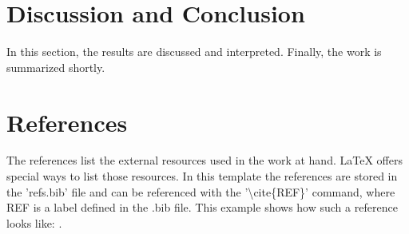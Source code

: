 \documentclass[twocolumn]{article}
\begin{document}
\section{Discussion and Conclusion}
In this section, the results are discussed and interpreted. Finally, the work is summarized shortly.

\section{References}
The references list the external resources used in the work at hand. \LaTeX$ $  offers special ways to list those resources. In this template the references are stored in the 'refs.bib' file and can be referenced with the '\textbackslash$ $cite\{REF\}' command, where REF is a label defined in the .bib file. This example shows how such a reference looks like: \cite{exa}.



\end{document}
